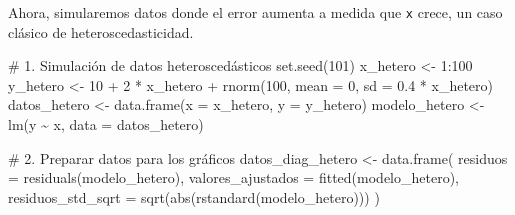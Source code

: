 \documentclass[
  letterpaper,
  DIV=11,
  numbers=noendperiod]{scrreprt}
\newenvironment{Shaded}{\begin{snugshade}}{\end{snugshade}}
\newcommand{\AttributeTok}[1]{\textcolor[rgb]{0.40,0.45,0.13}{#1}}
\newcommand{\CommentTok}[1]{\textcolor[rgb]{0.37,0.37,0.37}{#1}}
\newcommand{\DecValTok}[1]{\textcolor[rgb]{0.68,0.00,0.00}{#1}}
\newcommand{\FloatTok}[1]{\textcolor[rgb]{0.68,0.00,0.00}{#1}}
\newcommand{\FunctionTok}[1]{\textcolor[rgb]{0.28,0.35,0.67}{#1}}
\newcommand{\NormalTok}[1]{\textcolor[rgb]{0.00,0.23,0.31}{#1}}
\newcommand{\OtherTok}[1]{\textcolor[rgb]{0.00,0.23,0.31}{#1}}
\newcommand{\SpecialCharTok}[1]{\textcolor[rgb]{0.37,0.37,0.37}{#1}}
\begin{document}
\begin{tcolorbox}[enhanced jigsaw, leftrule=.75mm, breakable, colbacktitle=quarto-callout-tip-color!10!white, bottomrule=.15mm, colframe=quarto-callout-tip-color-frame, toprule=.15mm, colback=white, coltitle=black, bottomtitle=1mm, left=2mm, title=\textcolor{quarto-callout-tip-color}{\faLightbulb}\hspace{0.5em}{Contraejemplo: Violación del supuesto de homocedasticidad}, opacityback=0, arc=.35mm, opacitybacktitle=0.6, toptitle=1mm, titlerule=0mm, rightrule=.15mm]

Ahora, simularemos datos donde el error aumenta a medida que \texttt{x}
crece, un caso clásico de heteroscedasticidad.

\begin{Shaded}
\begin{Highlighting}[]
\CommentTok{\# 1. Simulación de datos heteroscedásticos}
\FunctionTok{set.seed}\NormalTok{(}\DecValTok{101}\NormalTok{)}
\NormalTok{x\_hetero }\OtherTok{\textless{}{-}} \DecValTok{1}\SpecialCharTok{:}\DecValTok{100}
\NormalTok{y\_hetero }\OtherTok{\textless{}{-}} \DecValTok{10} \SpecialCharTok{+} \DecValTok{2} \SpecialCharTok{*}\NormalTok{ x\_hetero }\SpecialCharTok{+} \FunctionTok{rnorm}\NormalTok{(}\DecValTok{100}\NormalTok{, }\AttributeTok{mean =} \DecValTok{0}\NormalTok{, }\AttributeTok{sd =} \FloatTok{0.4} \SpecialCharTok{*}\NormalTok{ x\_hetero)}
\NormalTok{datos\_hetero }\OtherTok{\textless{}{-}} \FunctionTok{data.frame}\NormalTok{(}\AttributeTok{x =}\NormalTok{ x\_hetero, }\AttributeTok{y =}\NormalTok{ y\_hetero)}
\NormalTok{modelo\_hetero }\OtherTok{\textless{}{-}} \FunctionTok{lm}\NormalTok{(y }\SpecialCharTok{\textasciitilde{}}\NormalTok{ x, }\AttributeTok{data =}\NormalTok{ datos\_hetero)}

\CommentTok{\# 2. Preparar datos para los gráficos}
\NormalTok{datos\_diag\_hetero }\OtherTok{\textless{}{-}} \FunctionTok{data.frame}\NormalTok{(}
  \AttributeTok{residuos =} \FunctionTok{residuals}\NormalTok{(modelo\_hetero),}
  \AttributeTok{valores\_ajustados =} \FunctionTok{fitted}\NormalTok{(modelo\_hetero),}
  \AttributeTok{residuos\_std\_sqrt =} \FunctionTok{sqrt}\NormalTok{(}\FunctionTok{abs}\NormalTok{(}\FunctionTok{rstandard}\NormalTok{(modelo\_hetero)))}
\NormalTok{)}


\end{Highlighting}
\end{Shaded}
\end{tcolorbox}
\end{document}
